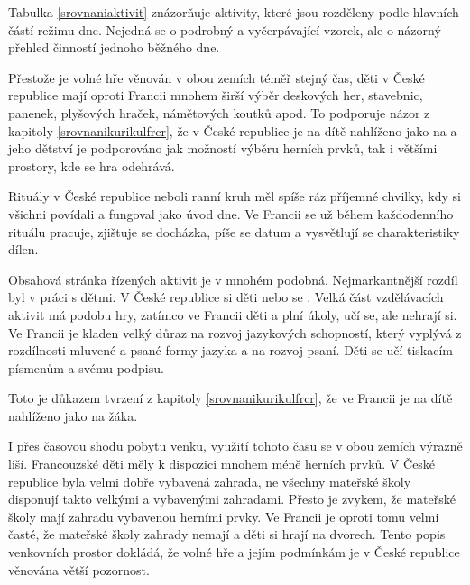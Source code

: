 	Tabulka \ref{srovnaniaktivit} znázorňuje aktivity, které jsou rozděleny podle hlavních částí režimu dne. Nejedná se o podrobný a vyčerpávající vzorek, ale o názorný přehled činností jednoho běžného dne. 

	Přestože je volné hře věnován v obou zemích téměř stejný čas, děti v České republice mají oproti Francii mnohem širší výběr deskových her, stavebnic, panenek, plyšových hraček, námětových koutků apod. To podporuje názor z kapitoly \ref{srovnanikurikulfrcr}, že v České republice je na dítě nahlíženo jako na  a jeho dětství je podporováno jak možností výběru herních prvků, tak i většími prostory, kde se hra odehrává. 

	Rituály v České republice neboli ranní kruh měl spíše ráz příjemné chvilky, kdy si všichni povídali a fungoval jako úvod dne. Ve Francii se už během každodenního rituálu pracuje, zjištuje se docházka, píše se datum a vysvětlují se charakteristiky dílen.

	Obsahová stránka řízených aktivit je v mnohém podobná. Nejmarkantnější rozdíl byl v práci s dětmi. V České republice si děti  nebo se . Velká část vzdělávacích aktivit má podobu hry, zatímco ve Francii děti  a plní úkoly, učí se, ale nehrají si. Ve Francii je kladen velký důraz na rozvoj jazykových schopností, který vyplývá z rozdílnosti mluvené a psané formy jazyka a na rozvoj psaní. Děti se učí tiskacím písmenům a svému podpisu.

	Toto je důkazem tvrzení z kapitoly \ref{srovnanikurikulfrcr}, že ve Francii je na dítě nahlíženo jako na žáka.

	I přes časovou shodu pobytu venku, využití tohoto času se v obou zemích výrazně liší. Francouzské děti měly k dispozici mnohem méně herních prvků. V České republice byla velmi dobře vybavená zahrada, ne všechny mateřské školy disponují takto velkými a vybavenými zahradami. Přesto je zvykem, že mateřské školy mají zahradu vybavenou herními prvky. Ve Francii je oproti tomu velmi časté, že mateřské školy zahrady nemají a děti si hrají na dvorech. Tento popis venkovních prostor dokládá, že volné hře a jejím podmínkám je v České republice věnována větší pozornost.



		
	


